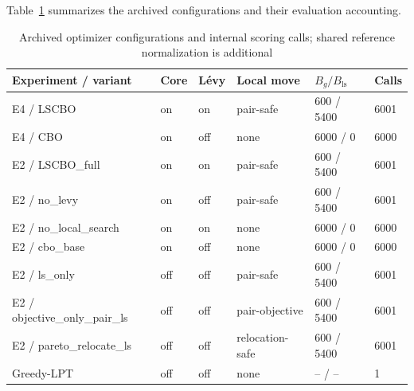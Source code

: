 \documentclass[pdflatex,onecolumn,sn-mathphys-num]{sn-jnl}
\begin{document}
Table~\ref{tab:configuration_map} summarizes the archived configurations and their evaluation accounting.

\begin{table}[htbp]\centering\scriptsize
\caption{Archived optimizer configurations and internal scoring calls; shared reference normalization is additional}\label{tab:configuration_map}
\setlength{\tabcolsep}{2pt}
\begin{tabular}{p{}p{}p{}p{}p{}p{}}
\toprule Experiment / variant & Core & L\'{e}vy & Local move & $B_g/B_{\mathrm{ls}}$ & Calls \\
\midrule
E4 / LSCBO & on & on & pair-safe & 600 / 5400 & 6001 \\
E4 / CBO & on & off & none & 6000 / 0 & 6000 \\
E2 / LSCBO\_full & on & on & pair-safe & 600 / 5400 & 6001 \\
E2 / no\_levy & on & off & pair-safe & 600 / 5400 & 6001 \\
E2 / no\_local\_search & on & on & none & 6000 / 0 & 6000 \\
E2 / cbo\_base & on & off & none & 6000 / 0 & 6000 \\
E2 / ls\_only & off & off & pair-safe & 600 / 5400 & 6001 \\
E2 / objective\_only\_pair\_ls & off & off & pair-objective & 600 / 5400 & 6001 \\
E2 / pareto\_relocate\_ls & off & off & relocation-safe & 600 / 5400 & 6001 \\
Greedy-LPT & off & off & none & -- / -- & 1 \\
\bottomrule\end{tabular}
\par{}
\end{table}
\end{document}

